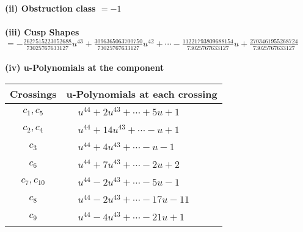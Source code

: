 \documentclass[1p]{elsarticle_modified}
\theoremstyle{definition}
\begin{document}
\flushleft \textbf{(ii) Obstruction class $= -1$}\\~\\
\flushleft \textbf{(iii) Cusp Shapes $= -\frac{2627515223052688}{73025767633127} u^{43}+\frac{3096365063700750}{73025767633127} u^{42}+\cdots-\frac{11221793809688154}{73025767633127} u+\frac{2703461955268724}{73025767633127}$}\\~\\
\newpage\renewcommand{\arraystretch}{1}
\flushleft \textbf{(iv) u-Polynomials at the component}\newline \\
\begin{tabular}{m{50pt}|m{274pt}}
Crossings & \hspace{64pt}u-Polynomials at each crossing \\
\hline $$\begin{aligned}c_{1},c_{5}\end{aligned}$$&$\begin{aligned}
&u^{44}+2 u^{43}+\cdots+5 u+1
\end{aligned}$\\
\hline $$\begin{aligned}c_{2},c_{4}\end{aligned}$$&$\begin{aligned}
&u^{44}+14 u^{43}+\cdots- u+1
\end{aligned}$\\
\hline $$\begin{aligned}c_{3}\end{aligned}$$&$\begin{aligned}
&u^{44}+4 u^{43}+\cdots- u-1
\end{aligned}$\\
\hline $$\begin{aligned}c_{6}\end{aligned}$$&$\begin{aligned}
&u^{44}+7 u^{43}+\cdots-2 u+2
\end{aligned}$\\
\hline $$\begin{aligned}c_{7},c_{10}\end{aligned}$$&$\begin{aligned}
&u^{44}-2 u^{43}+\cdots-5 u-1
\end{aligned}$\\
\hline $$\begin{aligned}c_{8}\end{aligned}$$&$\begin{aligned}
&u^{44}-2 u^{43}+\cdots-17 u-11
\end{aligned}$\\
\hline $$\begin{aligned}c_{9}\end{aligned}$$&$\begin{aligned}
&u^{44}-4 u^{43}+\cdots-21 u+1
\end{aligned}$\\
\hline
\end{tabular}\\~\\
\end{document}
